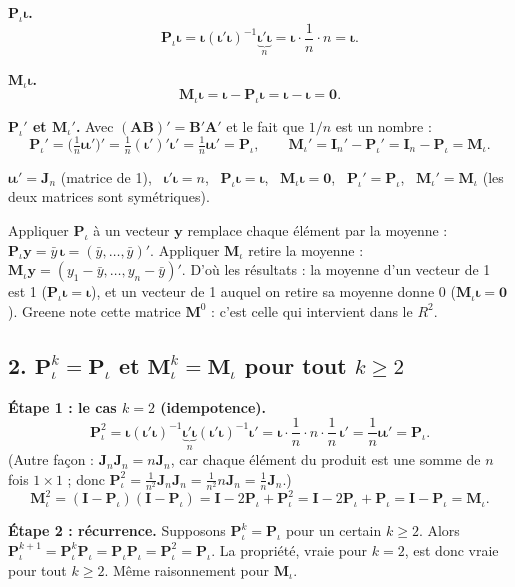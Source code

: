 \documentclass[11pt,a4paper]{article}
\newcommand{\vi}{\bm{\iota}}
\newcommand{\vy}{\mathbf{y}}\newcommand{\vY}{\mathbf{Y}}\newcommand{\vX}{\mathbf{X}}
\newcommand{\I}{\mathbf{I}}\newcommand{\J}{\mathbf{J}}
\newcommand{\Pm}{\mathbf{P}}\newcommand{\Mm}{\mathbf{M}}
\begin{document}
\textbf{$\Pm_\iota\vi$.}
\[
\Pm_\iota\vi=\vi(\vi'\vi)^{-1}\underbrace{\vi'\vi}_{n}=\vi\cdot\frac1n\cdot n=\vi .
\]

\textbf{$\Mm_\iota\vi$.}
\[
\Mm_\iota\vi=\vi-\Pm_\iota\vi=\vi-\vi=\mathbf 0 .
\]

\textbf{$\Pm_\iota'$ et $\Mm_\iota'$.} Avec $(\mathbf{AB})'=\mathbf B'\mathbf A'$ et le fait que $1/n$ est un nombre :
\[
\Pm_\iota'=\Big(\tfrac1n\vi\vi'\Big)'=\tfrac1n(\vi')'\vi'=\tfrac1n\vi\vi'=\Pm_\iota,
\qquad
\Mm_\iota'=\I_n'-\Pm_\iota'=\I_n-\Pm_\iota=\Mm_\iota .
\]

\begin{reponse}
$\vi\vi'=\J_n$ (matrice de 1), \ $\vi'\vi=n$, \ $\Pm_\iota\vi=\vi$, \ $\Mm_\iota\vi=\mathbf 0$, \ $\Pm_\iota'=\Pm_\iota$, \ $\Mm_\iota'=\Mm_\iota$ (les deux matrices sont symétriques).
\end{reponse}

\begin{intuition}
Appliquer $\Pm_\iota$ à un vecteur $\vy$ remplace chaque élément par la moyenne : $\Pm_\iota\vy=\bar y\,\vi=(\bar y,\dots,\bar y)'$. Appliquer $\Mm_\iota$ retire la moyenne : $\Mm_\iota\vy=(y_1-\bar y,\dots,y_n-\bar y)'$. D'où les résultats : la moyenne d'un vecteur de 1 est 1 ($\Pm_\iota\vi=\vi$), et un vecteur de 1 auquel on retire sa moyenne donne 0 ($\Mm_\iota\vi=\mathbf 0$). Greene note cette matrice $\Mm^0$ : c'est celle qui intervient dans le $R^2$.
\end{intuition}

\subsection*{2. $\Pm_\iota^k=\Pm_\iota$ et $\Mm_\iota^k=\Mm_\iota$ pour tout $k\ge2$}

\textbf{Étape 1 : le cas $k=2$ (idempotence).}
\[
\Pm_\iota^2=\vi(\vi'\vi)^{-1}\underbrace{\vi'\vi}_{n}(\vi'\vi)^{-1}\vi'
=\vi\cdot\frac1n\cdot n\cdot\frac1n\,\vi'=\frac1n\vi\vi'=\Pm_\iota .
\]
(Autre façon : $\J_n\J_n=n\J_n$, car chaque élément du produit est une somme de $n$ fois $1\times1$ ; donc $\Pm_\iota^2=\frac1{n^2}\J_n\J_n=\frac1{n^2}n\J_n=\frac1n\J_n$.)
\[
\Mm_\iota^2=(\I-\Pm_\iota)(\I-\Pm_\iota)=\I-2\Pm_\iota+\Pm_\iota^2=\I-2\Pm_\iota+\Pm_\iota=\I-\Pm_\iota=\Mm_\iota .
\]

\textbf{Étape 2 : récurrence.} Supposons $\Pm_\iota^k=\Pm_\iota$ pour un certain $k\ge2$. Alors
$\Pm_\iota^{k+1}=\Pm_\iota^k\Pm_\iota=\Pm_\iota\Pm_\iota=\Pm_\iota^2=\Pm_\iota$. La propriété, vraie pour $k=2$, est donc vraie pour tout $k\ge2$. Même raisonnement pour $\Mm_\iota$.
\end{document}
